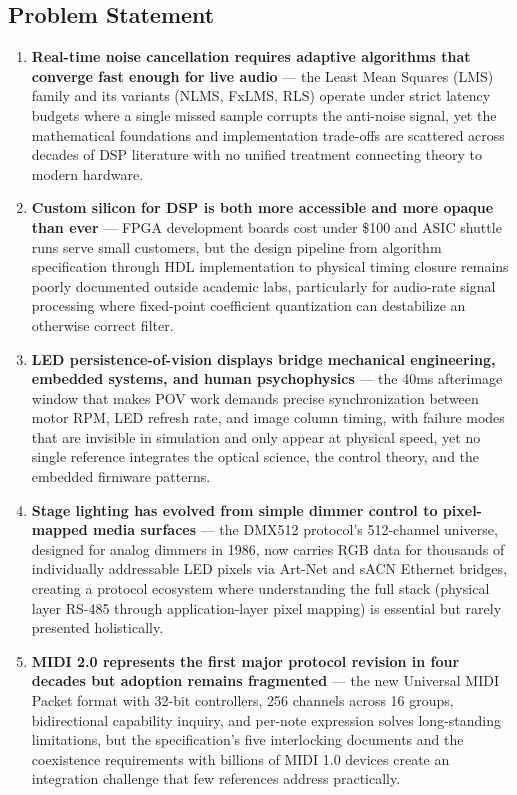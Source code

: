 \documentclass[11pt,letterpaper]{article}
\begin{document}
\subsection{Problem Statement}

\begin{enumerate}[leftmargin=2em]
\item \textbf{Real-time noise cancellation requires adaptive algorithms that converge fast enough for live audio} --- the Least Mean Squares (LMS) family and its variants (NLMS, FxLMS, RLS) operate under strict latency budgets where a single missed sample corrupts the anti-noise signal, yet the mathematical foundations and implementation trade-offs are scattered across decades of DSP literature with no unified treatment connecting theory to modern hardware.

\item \textbf{Custom silicon for DSP is both more accessible and more opaque than ever} --- FPGA development boards cost under \$100 and ASIC shuttle runs serve small customers, but the design pipeline from algorithm specification through HDL implementation to physical timing closure remains poorly documented outside academic labs, particularly for audio-rate signal processing where fixed-point coefficient quantization can destabilize an otherwise correct filter.

\item \textbf{LED persistence-of-vision displays bridge mechanical engineering, embedded systems, and human psychophysics} --- the 40ms afterimage window that makes POV work demands precise synchronization between motor RPM, LED refresh rate, and image column timing, with failure modes that are invisible in simulation and only appear at physical speed, yet no single reference integrates the optical science, the control theory, and the embedded firmware patterns.

\item \textbf{Stage lighting has evolved from simple dimmer control to pixel-mapped media surfaces} --- the DMX512 protocol's 512-channel universe, designed for analog dimmers in 1986, now carries RGB data for thousands of individually addressable LED pixels via Art-Net and sACN Ethernet bridges, creating a protocol ecosystem where understanding the full stack (physical layer RS-485 through application-layer pixel mapping) is essential but rarely presented holistically.

\item \textbf{MIDI 2.0 represents the first major protocol revision in four decades but adoption remains fragmented} --- the new Universal MIDI Packet format with 32-bit controllers, 256 channels across 16 groups, bidirectional capability inquiry, and per-note expression solves long-standing limitations, but the specification's five interlocking documents and the coexistence requirements with billions of MIDI 1.0 devices create an integration challenge that few references address practically.
\end{enumerate}
\end{document}
